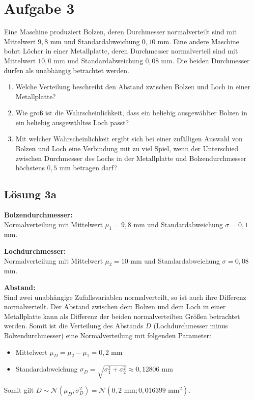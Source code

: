 \documentclass[main.tex]{subfiles}
\begin{document}
\section{Aufgabe 3}
Eine Maschine produziert Bolzen, deren Durchmesser normalverteilt sind mit Mittelwert $9,8$ mm und Standardabweichung $0,10$ mm. Eine andere Maschine bohrt Löcher in einer
Metallplatte, deren Durchmesser normalverteil sind mit Mittelwert $10,0$ mm und Standardabweichung $0,08$ mm. Die beiden Durchmesser dürfen als unabhängig betrachtet werden.
\begin{enumerate}
\item Welche Verteilung beschreibt den Abstand zwischen Bolzen und Loch in einer Metallplatte?
\item Wie groß ist die Wahrscheinlichkeit, dass ein beliebig ausgewählter Bolzen in ein beliebig ausgewähltes Loch passt?
\item Mit welcher Wahrscheinlichkeit ergibt sich bei einer zufälligen Auswahl von Bolzen und Loch eine Verbindung mit zu viel Spiel, wenn der Unterschied zwischen
Durchmesser des Lochs in der Metallplatte und Bolzendurchmesser höchstens $0,5$ mm betragen darf?
\end{enumerate}

\subsection{Lösung 3a}

\textbf{Bolzendurchmesser:}\\
Normalverteilung mit Mittelwert $\mu_1 = 9,8$ mm und Standardabweichung $\sigma = 0,1$ mm.

\textbf{Lochdurchmesser:}\\
Normalverteilung mit Mittelwert $\mu_2 = 10$ mm und Standardabweichung $\sigma = 0,08$ mm.

\textbf{Abstand:}\\
Sind zwei unabhängige Zufallsvariablen normalverteilt, so ist auch ihre Differenz normalverteilt. Der Abstand zwischen dem Bolzen und dem Loch in einer Metallplatte kann als Differenz der beiden normalverteilten Größen betrachtet werden. Somit ist die Verteilung des Abstands $D$ (Lochdurchmesser minus Bolzendurchmesser) eine Normalverteilung mit folgenden Parameter:
\begin{itemize}
    \item Mittelwert $\mu_D = \mu_2 - \mu_1 =0,2$ mm
    \item Standardabweichung $\sigma_D = \sqrt{\sigma_1^2 + \sigma_2^2} \approx 0,12806$ mm
\end{itemize}
Somit gilt $D\sim\mathcal{N}(\mu_D, \sigma_D^2) = \mathcal{N}(0,2\mbox{ mm}; 0,016399\mbox{ mm}^2)$.
\end{document}
